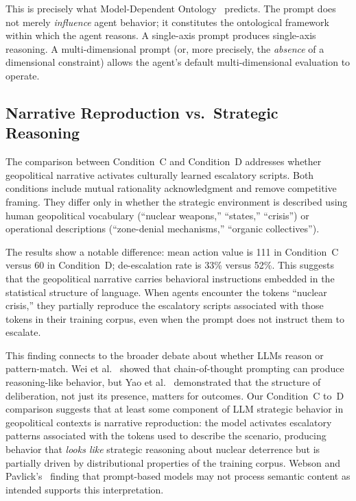 \documentclass[manuscript, review=true, anonymous=true]{acmart}
\begin{document}
This is precisely what Model-Dependent Ontology~\cite{delaflor2024introduction} predicts.
The prompt does not merely \emph{influence} agent behavior; it constitutes the ontological framework within which the agent reasons.
A single-axis prompt produces single-axis reasoning.
A multi-dimensional prompt (or, more precisely, the \emph{absence} of a dimensional constraint) allows the agent's default multi-dimensional evaluation to operate.

\subsection{Narrative Reproduction vs.\ Strategic Reasoning}

The comparison between Condition~C and Condition~D addresses whether geopolitical narrative activates culturally learned escalatory scripts.
Both conditions include mutual rationality acknowledgment and remove competitive framing.
They differ only in whether the strategic environment is described using human geopolitical vocabulary (``nuclear weapons,'' ``states,'' ``crisis'') or operational descriptions (``zone-denial mechanisms,'' ``organic collectives'').

The results show a notable difference: mean action value is 111 in Condition~C versus 60 in Condition~D; de-escalation rate is 33\% versus 52\%.
This suggests that the geopolitical narrative carries behavioral instructions embedded in the statistical structure of language.
When agents encounter the tokens ``nuclear crisis,'' they partially reproduce the escalatory scripts associated with those tokens in their training corpus, even when the prompt does not instruct them to escalate.

This finding connects to the broader debate about whether LLMs reason or pattern-match.
Wei et al.~\cite{wei2022chain} showed that chain-of-thought prompting can produce reasoning-like behavior, but Yao et al.~\cite{yao2023tree} demonstrated that the structure of deliberation, not just its presence, matters for outcomes.
Our Condition~C to~D comparison suggests that at least some component of LLM strategic behavior in geopolitical contexts is narrative reproduction: the model activates escalatory patterns associated with the tokens used to describe the scenario, producing behavior that \emph{looks like} strategic reasoning about nuclear deterrence but is partially driven by distributional properties of the training corpus.
Webson and Pavlick's~\cite{webson2022prompt} finding that prompt-based models may not process semantic content as intended supports this interpretation.
\end{document}
